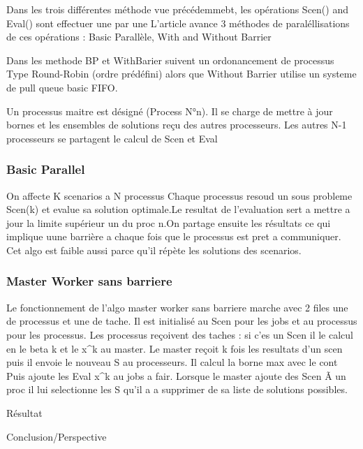 \documentclass{beamer}
\begin{document}
        \begin{frame}
            Dans les trois différentes méthode vue précédemmebt, les opérations Scen() and Eval() sont effectuer une par une
            L'article avance 3 méthodes de paraléllisations de ces opérations : Basic Parallèle, With and Without Barrier            
            
            Dans les methode BP et WithBarier suivent un ordonancement de processus Type Round-Robin (ordre prédéfini) 
            alors que Without Barrier utilise un systeme de pull queue basic FIFO.
          
          
        \end{frame}
        
                \begin{frame}
            Un processus maitre est désigné (Process N°n). Il se charge de mettre à jour bornes et les ensembles de solutions reçu des autres processeurs. Les autres N-1 processeurs se partagent le calcul de Scen et Eval
        \end{frame}
	
	
	\begin{frame}
          \frametitle{Basic Parallel}
	  On affecte K scenarios  a N processus Chaque processus resoud un sous probleme Scen(k) et evalue sa solution optimale.Le resultat de l'evaluation sert a  mettre a jour la limite supérieur un du proc n.On partage ensuite les résultats ce qui implique uune barrière a  chaque fois que le processus est pret a communiquer. Cet algo est faible aussi parce qu'il répète les solutions des scenarios.          
        \end{frame}
	
	
	\begin{frame}
	\frametitle{Master Worker sans barriere}
	Le fonctionnement de l'algo master worker sans barriere marche avec 2 files une de processus et une de tache. Il est initialisé au Scen pour les jobs et au processus pour les processus. Les processus reçoivent des taches : si c'es un Scen il le calcul en le beta k et le x^k au master. Le master reçoit k fois les resultats d'un scen puis il envoie le nouveau S au processeurs. Il calcul la borne max avec le cont Puis ajoute les Eval x^k au jobs a fair. Lorsque le master ajoute des Scen Ã  un proc il lui selectionne les S qu'il a a  supprimer de sa liste de solutions possibles.
        \end{frame}
	
        \begin{frame}

            Résultat

        \end{frame}
        
        \begin{frame}

	         Conclusion/Perspective

        \end{frame}

\end{document}
